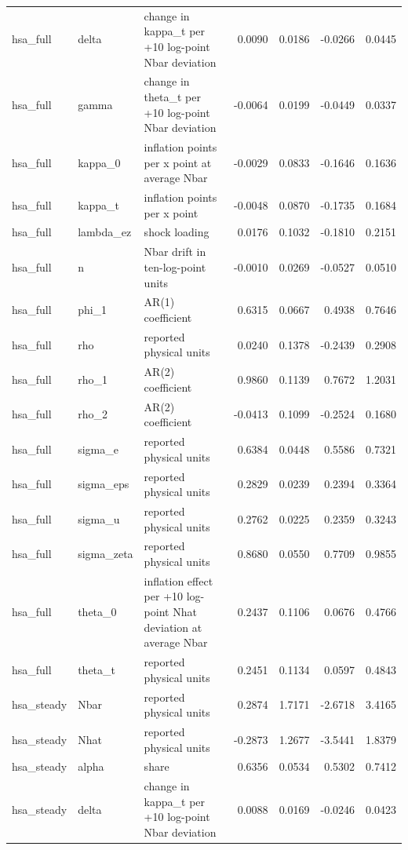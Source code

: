 \begin{tabular}{lllrrrr}
hsa\_full & delta & change in kappa\_t per +10 log-point Nbar deviation & 0.0090 & 0.0186 & -0.0266 & 0.0445 \\
hsa\_full & gamma & change in theta\_t per +10 log-point Nbar deviation & -0.0064 & 0.0199 & -0.0449 & 0.0337 \\
hsa\_full & kappa\_0 & inflation points per x point at average Nbar & -0.0029 & 0.0833 & -0.1646 & 0.1636 \\
hsa\_full & kappa\_t & inflation points per x point & -0.0048 & 0.0870 & -0.1735 & 0.1684 \\
hsa\_full & lambda\_ez & shock loading & 0.0176 & 0.1032 & -0.1810 & 0.2151 \\
hsa\_full & n & Nbar drift in ten-log-point units & -0.0010 & 0.0269 & -0.0527 & 0.0510 \\
hsa\_full & phi\_1 & AR(1) coefficient & 0.6315 & 0.0667 & 0.4938 & 0.7646 \\
hsa\_full & rho & reported physical units & 0.0240 & 0.1378 & -0.2439 & 0.2908 \\
hsa\_full & rho\_1 & AR(2) coefficient & 0.9860 & 0.1139 & 0.7672 & 1.2031 \\
hsa\_full & rho\_2 & AR(2) coefficient & -0.0413 & 0.1099 & -0.2524 & 0.1680 \\
hsa\_full & sigma\_e & reported physical units & 0.6384 & 0.0448 & 0.5586 & 0.7321 \\
hsa\_full & sigma\_eps & reported physical units & 0.2829 & 0.0239 & 0.2394 & 0.3364 \\
hsa\_full & sigma\_u & reported physical units & 0.2762 & 0.0225 & 0.2359 & 0.3243 \\
hsa\_full & sigma\_zeta & reported physical units & 0.8680 & 0.0550 & 0.7709 & 0.9855 \\
hsa\_full & theta\_0 & inflation effect per +10 log-point Nhat deviation at average Nbar & 0.2437 & 0.1106 & 0.0676 & 0.4766 \\
hsa\_full & theta\_t & reported physical units & 0.2451 & 0.1134 & 0.0597 & 0.4843 \\
hsa\_steady & Nbar & reported physical units & 0.2874 & 1.7171 & -2.6718 & 3.4165 \\
hsa\_steady & Nhat & reported physical units & -0.2873 & 1.2677 & -3.5441 & 1.8379 \\
hsa\_steady & alpha & share & 0.6356 & 0.0534 & 0.5302 & 0.7412 \\
hsa\_steady & delta & change in kappa\_t per +10 log-point Nbar deviation & 0.0088 & 0.0169 & -0.0246 & 0.0423 \\

\end{tabular}
